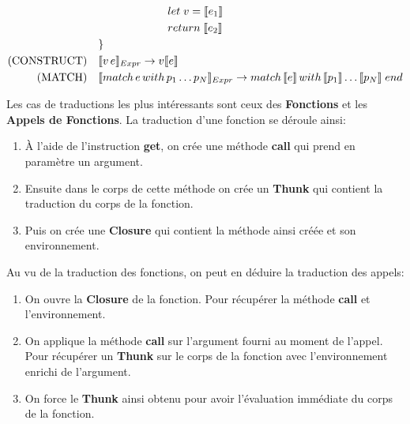 \documentclass[12pt]{article}
\begin{document}
\begin{align*}
                               & \quad \quad \quad \quad \quad \quad \; let \; v = \llbracket e_1 \rrbracket                                                                                                                                          \\
                               & \quad \quad \quad \quad \quad \quad \; return \;\llbracket e_2 \rrbracket                                                                                                                                            \\
                               & \}                                                                                                                                                                             \\
      \text{(CONSTRUCT)} \quad & \llbracket v \, e \rrbracket_{Expr} \rightarrow v\llbracket e \rrbracket                                                                                                                  \\
      \text{(MATCH)} \quad     & \llbracket match \, e \, with \, p_1 \dots p_N  \rrbracket_{Expr}\rightarrow  match \, \llbracket e \rrbracket \, with \, \llbracket p_1 \rrbracket \dots \llbracket p_N \rrbracket \; end        \\
\end{align*}

Les cas de traductions les plus intéressants sont ceux des \textbf{Fonctions} et les \textbf{Appels de Fonctions}.
La traduction d'une fonction se déroule ainsi:
\begin{enumerate}
      \tightlist
      \item
            À l'aide de l'instruction \textbf{get}, on crée une méthode \textbf{call} qui prend en paramètre un argument.
      \item
            Ensuite dans le corps de cette méthode on crée un \textbf{Thunk} qui contient la traduction du corps de la fonction.
      \item
            Puis on crée une \textbf{Closure} qui contient la méthode ainsi créée et son environnement.
\end{enumerate}
Au vu de la traduction des fonctions, on peut en déduire la traduction des appels:
\begin{enumerate}
      \tightlist
      \item
            On ouvre la \textbf{Closure} de la fonction.
            Pour récupérer la méthode \textbf{call} et l'environnement.
      \item
            On applique la méthode \textbf{call} sur l'argument fourni au moment de l'appel.
            Pour récupérer un \textbf{Thunk} sur le corps de la fonction avec l'environnement enrichi de l'argument.
      \item
            On force le \textbf{Thunk} ainsi obtenu pour avoir l'évaluation immédiate du corps de la fonction.
\end{enumerate}
\end{document}
